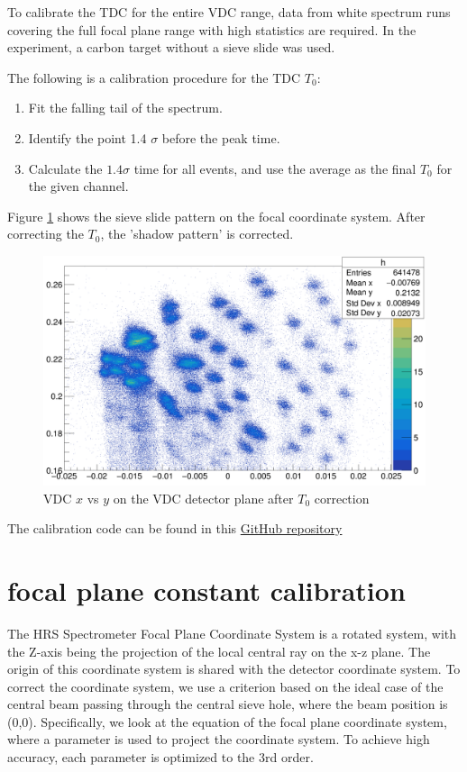 To calibrate the TDC for the entire VDC range, data from white spectrum runs covering the full focal plane range with high statistics are required. In the experiment, a carbon target without a sieve slide was used.

The following is a calibration procedure for the TDC $T_0$: 
\begin{enumerate}
\item Fit the falling tail of the spectrum.
\item Identify the point 1.4 $\sigma$ before the peak time.
\item Calculate the $1.4\sigma$ time for all events, and use the average as the final $T_0$ for the given channel.
\end{enumerate}

Figure \ref{fig:vdc_t0_after_correction} shows the sieve slide pattern on the focal coordinate system. After correcting the $T_0$, the 'shadow pattern' is corrected.

\begin{figure}
\centering
\includegraphics[width=\textwidth]{images/chap4/vdc_t0_after_correction.png}
\caption{VDC $x$ vs $y$ on the VDC detector plane after $T_0$ correction}
\label{fig:vdc_t0_after_correction}
\end{figure}


The calibration code can be found in this \href{https://github.com/Jiansiyu/GeneralScripts/tree/master/VDC_T0_Cali}{GitHub repository}  



\section{focal plane constant calibration}

The HRS Spectrometer Focal Plane Coordinate System is a rotated system, with the Z-axis being the projection of the local central ray on the x-z plane. The origin of this coordinate system is shared with the detector coordinate system. To correct the coordinate system, we use a criterion based on the ideal case of the central beam passing through the central sieve hole, where the beam position is (0,0). Specifically, we look at the equation of the focal plane coordinate system, where a parameter is used to project the coordinate system. To achieve high accuracy, each parameter is optimized to the 3rd order.

